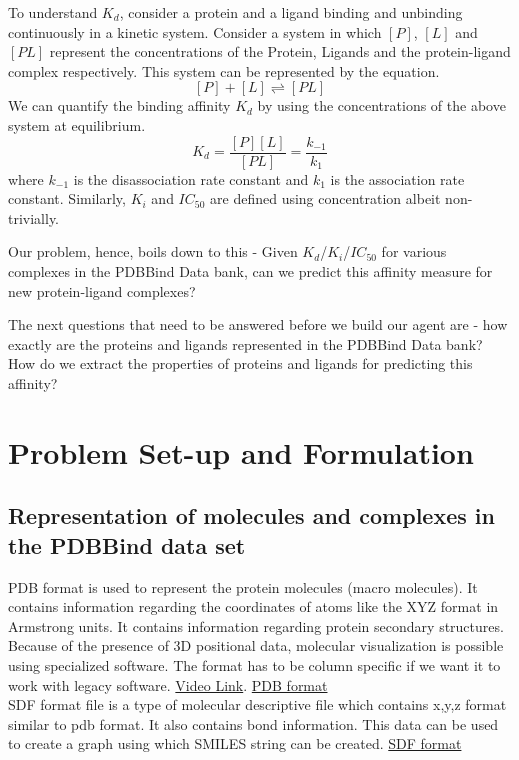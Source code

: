 \documentclass[11pt]{article}
\begin{document}
To understand $K_d$, consider a protein and a ligand binding and unbinding continuously in a kinetic system.
Consider a system in which $[P]$, $[L]$ and $[PL]$ represent the concentrations of the Protein, Ligands 
and the protein-ligand complex respectively.
This system can be represented by the equation.
$$[P] + [L] \rightleftharpoons [PL]$$
We can quantify the binding affinity $K_d$ by using the concentrations of the above system at equilibrium.
$$K_d = \frac{[P][L]}{[PL]} = \frac{k_{-1}}{k_1}$$
where $k_{-1}$ is the disassociation rate constant and $k_1$ is the association rate constant.
Similarly, $K_i$ and $IC_{50}$ are defined using concentration albeit non-trivially. 
\cite{binding_affinity_description}

Our problem, hence, boils down to this - Given $K_d$/$K_i$/$IC_{50}$ for various complexes in the PDBBind Data bank,
can we predict this affinity measure for new protein-ligand complexes?

The next questions that need to be answered before we build our agent are - how exactly are the proteins and ligands represented in the PDBBind Data bank?
How do we extract the properties of proteins and ligands for predicting this affinity?

\section{Problem Set-up and Formulation}

\subsection{Representation of molecules and complexes in the PDBBind data set}

PDB format is used to represent the protein molecules (macro molecules).
It contains information regarding the coordinates of atoms like the XYZ format in Armstrong units.
It contains information regarding protein secondary structures.
Because of the presence of 3D positional data, molecular visualization is possible using specialized software. 
The format has to be column specific if we want it to work with legacy software.
\href{https://www.youtube.com/watch?v=_1q7sfjl2Kw}{Video Link}.
\href{https://en.wikipedia.org/wiki/Protein_Data_Bank_(file_format)}{PDB format}\\

SDF format file is a type of molecular descriptive file which contains x,y,z format similar to pdb format.
It also contains bond information.
This data can be used to create a graph using which SMILES string can be created.
\href{https://en.wikipedia.org/wiki/Chemical_table_file}{SDF format}
\end{document}
